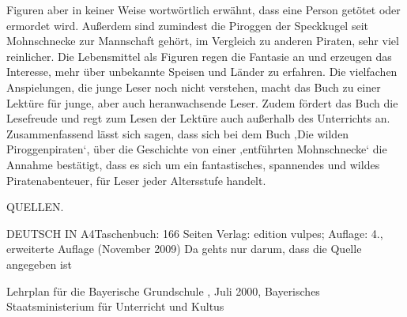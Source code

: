 Figuren aber in keiner Weise wortwörtlich erwähnt, dass eine Person getötet oder ermordet wird. Außerdem sind zumindest die Piroggen der Speckkugel seit Mohnschnecke zur Mannschaft gehört, im Vergleich zu anderen Piraten, sehr viel reinlicher. Die Lebensmittel als Figuren regen die Fantasie an und erzeugen das Interesse, mehr über unbekannte Speisen und Länder zu erfahren. Die vielfachen Anspielungen, die junge Leser noch nicht verstehen, macht das Buch zu einer Lektüre für junge, aber auch heranwachsende Leser. Zudem fördert das Buch die Lesefreude und regt zum Lesen der Lektüre auch außerhalb des Unterrichts an.
\\
Zusammenfassend lässt sich sagen, dass sich bei dem Buch ‚Die wilden Piroggenpiraten‘, über die Geschichte von einer ‚entführten Mohnschnecke‘ die Annahme bestätigt, dass es sich um ein fantastisches, spannendes und wildes Piratenabenteuer, für Leser jeder Altersstufe handelt.




QUELLEN.

 DEUTSCH IN A4Taschenbuch: 166 Seiten
      	Verlag: edition vulpes; Auflage: 4., erweiterte Auflage (November 2009)
\cite[]{DIN A4} Da gehts nur darum, dass die Quelle angegeben ist 


Lehrplan für die Bayerische Grundschule , Juli 2000, Bayerisches Staatsministerium für Unterricht und Kultus
\cite[S.171]{LP GS 2000} 
